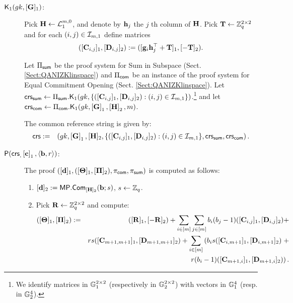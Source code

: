 \begin{description}

\item[{$\mathsf{K}_1({gk}, [\mathbf{{G}}]_1)$}:] 
Pick $\mathbf{{H}}\gets\mathcal{L}_1^{m,0}$, and denote by $\mathbf{h}_{j}$ the $j$ th column of $\mathbf{{H}}$. Pick $\mathbf{{T}}\gets\mathbb{Z}_q^{2\times 2}$ and for each $(i,j)\in\mathcal{I}_{m,1}$ define matrices
$$([\mathbf{{C}}_{i,j}]_1,[\mathbf{{D}}_{i,j}]_2):=([\mathbf{g}_i\mathbf{h}_j^{\top}+\mathbf{{T}}]_1,[-\mathbf{{T}}]_2).$$

Let $\Pi_{\mathsf{sum}}$ be the proof system for Sum in Subspace 
(Sect. \ref{Sect:QANIZKlinspace}) and $\Pi_{\mathsf{com}}$
be an instance of the proof system for Equal Commitment Opening (Sect. \ref{Sect:QANIZKlinspace}).
Let
$\mathsf{crs}_{\mathsf{sum}} \gets \Pi_{\mathsf{sum}}.\mathsf{K}_1({gk}, \{([\mathbf{{C}}_{i,j}]_1,[\mathbf{{D}}_{i,j}]_2):(i,j)\in\mathcal{I}_{m,1}\})$.\footnote{We identify
matrices in $\mathbb{G}_1^{2 \times 2}$ (respectively in $\mathbb{G}_2^{2 \times 2}$) with vectors in $\mathbb{G}_1^{4}$ (resp. in $\mathbb{G}_2^{4}$).} and let $\mathsf{crs}_{\mathsf{com}} \gets \Pi_{\mathsf{com}}.\mathsf{K}_1({gk}, \left[\mathbf{{G}}\right]_1,\left[\mathbf{{H}}\right]_2,m)$. 

The common reference string is given by:
\begin{eqnarray*}
\mathsf{crs}&:=&\left( gk, \left[\mathbf{{G}}\right]_1,
    [\mathbf{{H}}]_2, \{([\mathbf{{C}}_{i,j}]_1, [\mathbf{{D}}_{i,j}]_2): (i,j) \in \mathcal{I}_{m,1}\},\mathsf{crs}_{\mathsf{sum}},\mathsf{crs}_{\mathsf{com}} \right).
 \end{eqnarray*}
\item[$\mathsf{P}(\mathsf{crs}_, \left[\mathbf{c}\right]_1, \langle \mathbf{b}, r \rangle)$:] The proof $([\mathbf{d}]_1,([\mathbf{{\Theta}}]_1,[\mathbf{{\Pi}}]_2),\pi_{\mathsf{com}},\pi_{\mathsf{sum}})$ is computed as follows:
\begin{enumerate}
\item $[\mathbf{d}]_2:= \mathsf{MP}.\mathsf{Com}_{[\mathbf{{H}}]_2} (\mathbf{b};s)$, $s \gets \mathbb{Z}_q$. 
\item Pick $\mathbf{{R}} \gets \mathbb{Z}_q^{2\times 2}$ and compute:
\iffull
\begin{eqnarray*}
([\mathbf{{\Theta}}]_1, [\mathbf{{\Pi}}]_2) & := & ([\mathbf{{R}}]_1,[-\mathbf{{R}}]_2)+
\sum_{i\in[m]}\sum_{j\in[m]}b_i(b_j-1)([\mathbf{{C}}_{i,j}]_1,[\mathbf{{D}}_{i,j}]_2)+\\
& &     rs([\mathbf{{C}}_{m+1,m+1}]_1,[\mathbf{{D}}_{m+1,m+1}]_2)+
  \sum_{i \in [m]}
 \left(b_i s  ([\mathbf{{C}}_{i,m+1}]_1,[\mathbf{{D}}_{i,m+1}]_2)\right. +\\
& & \left.r(b_i-1) ([\mathbf{{C}}_{m+1,i}]_1,[\mathbf{{D}}_{m+1,i}]_2)\right).
\end{eqnarray*}


\end{enumerate}
\end{description}
